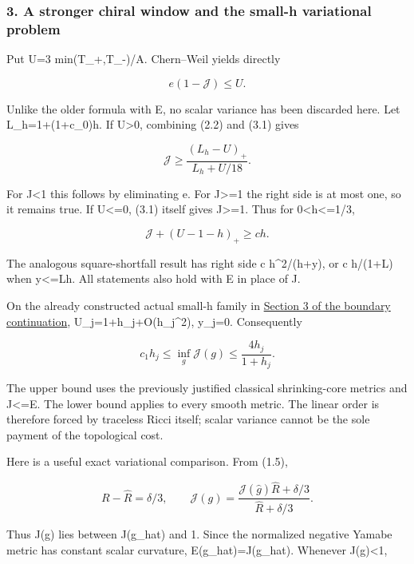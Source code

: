 \documentclass[
  10pt,
]{article}
\begin{document}
\hypertarget{a-stronger-chiral-window-and-the-small-h-variational-problem}{%
\subsubsection{3. A stronger chiral window and the small-h variational
problem}\label{a-stronger-chiral-window-and-the-small-h-variational-problem}}

Put U=3 min(T\_+,T\_-)/A. Chern--Weil yields directly

\[
 e(1-\mathcal J)\le U.                                 \tag{3.1}
\]

Unlike the older formula with E, no scalar variance has been discarded
here. Let L\_h=1+(1+c\_0)h. If U\textgreater0, combining (2.2) and (3.1)
gives

\[
 \boxed{\mathcal J\ge
       \frac{(L_h-U)_+}{L_h+U/18}.}                    \tag{3.2}
\]

For J\textless1 this follows by eliminating e. For J\textgreater=1 the
right side is at most one, so it remains true. If U\textless=0, (3.1)
itself gives J\textgreater=1. Thus for 0\textless h\textless=1/3,

\[
 \mathcal J+(U-1-h)_+\ge c h.                          \tag{3.3}
\]

The analogous square-shortfall result has right side c h\^{}2/(h+y), or
c h/(1+L) when y\textless=Lh. All statements also hold with E in place
of J.

On the already constructed actual small-h family in
\href{20260926_boundary_compatibility.md}{Section 3 of the boundary
continuation}, U\_j=1+h\_j+O(h\_j\^{}2), y\_j=0. Consequently

\[
 \boxed{c_1h_j\le\inf_g\mathcal J(g)
                  \le\frac{4h_j}{1+h_j}.}              \tag{3.4}
\]

The upper bound uses the previously justified classical shrinking-core
metrics and J\textless=E. The lower bound applies to every smooth
metric. The linear order is therefore forced by traceless Ricci itself;
scalar variance cannot be the sole payment of the topological cost.

Here is a useful exact variational comparison. From (1.5),

\[
 R-\widehat R=\delta/3,\qquad
 \mathcal J(g)=
 \frac{\mathcal J(\widehat g)\widehat R+\delta/3}
      {\widehat R+\delta/3}.                           \tag{3.5}
\]

Thus J(g) lies between J(g\_hat) and 1. Since the normalized negative
Yamabe metric has constant scalar curvature, E(g\_hat)=J(g\_hat).
Whenever J(g)\textless1,
\end{document}
